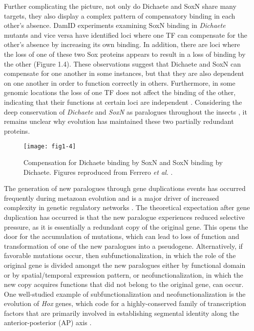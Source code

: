 Further complicating the picture, not only do Dichaete and SoxN share many targets, they also display a complex pattern of compensatory binding in each other’s absence. DamID experiments examining SoxN binding in \emph{Dichaete} mutants and vice versa have identified loci where one TF can compensate for the other’s absence by increasing its own binding. In addition, there are loci where the loss of one of these two Sox proteins appears to result in a loss of binding by the other (Figure 1.4). These observations suggest that Dichaete and SoxN can compensate for one another in some instances, but that they are also dependent on one another in order to function correctly in others. Furthermore, in some genomic locations the loss of one TF does not affect the binding of the other, indicating that their functions at certain loci are independent \citep{ferrero_soxneuro_2014}. Considering the deep conservation of \emph{Dichaete} and \emph{SoxN} as paralogues throughout the insects \citep{mckimmie_conserved_2005,wilson_evolution_2008}, it remains unclear why evolution has maintained these two partially redundant proteins. \\

\begin{figure}
\centering
\texttt{[image: fig1-4]}
\caption{Compensation for Dichaete binding by SoxN and SoxN binding by Dichaete. Figures reproduced from Ferrero \emph{et al.} \citet{ferrero_soxneuro_2014}.}
\label{Figure 1.4}
\end{figure}

The generation of new paralogues through gene duplications events has occurred frequently during metazoan evolution and is a major driver of increased complexity in genetic regulatory networks \citep{larroux_genesis_2008}. The theoretical expectation after gene duplication has occurred is that the new paralogue experiences reduced selective pressure, as it is essentially a redundant copy of the original gene. This opens the door for the accumulation of mutations, which can lead to loss of function and transformation of one of the new paralogues into a pseudogene. Alternatively, if favorable mutations occur, then subfunctionalization, in which the role of the original gene is divided amongst the new paralogues either by functional domain or by spatial/temporal expression pattern, or neofunctionalization, in which the new copy acquires functions that did not belong to the original gene, can occur\citep{force_preservation_1999,lynch_evolutionary_2000}. One well-studied example of subfunctionalization and neofunctionalization is the evolution of \emph{Hox} genes, which code for a highly-conserved family of transcription factors that are primarily involved in establishing segmental identity along the anterior-posterior (AP) axis \citep{kappen_evolution_1993}.\\ 

